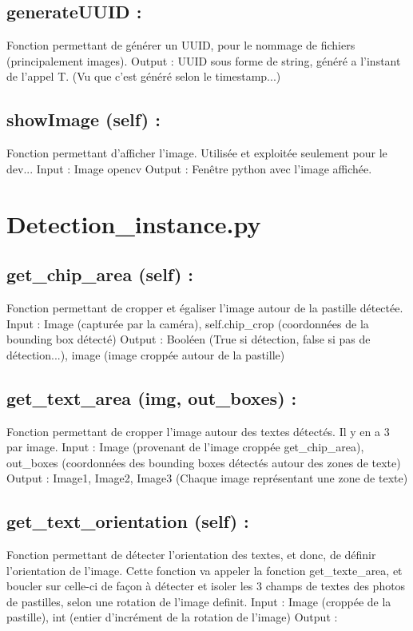 \subsection{generateUUID :}
Fonction permettant de générer un UUID, pour le nommage de fichiers (principalement images).
Output : UUID sous forme de string, généré a l’instant de l’appel T. (Vu que c’est généré selon le timestamp...)

\subsection{showImage (self) :}
Fonction permettant d’afficher l’image. Utilisée et exploitée seulement pour le dev...
Input : Image opencv
Output : Fenêtre python avec l’image affichée.

\section{Detection_instance.py}
\subsection{get_chip_area (self) :}
Fonction permettant de cropper et égaliser l’image autour de la pastille détectée.
Input : Image (capturée par la caméra), self.chip_crop (coordonnées de la bounding box détecté)
Output : Booléen (True si détection, false si pas de détection...), image (image croppée autour de la pastille)

\subsection{get_text_area (img, out_boxes) :}
Fonction permettant de cropper l’image autour des textes détectés. Il y en a 3 par image.
Input : Image (provenant de l’image croppée get_chip_area), out_boxes (coordonnées des bounding boxes détectés autour des zones de texte)
Output : Image1, Image2, Image3 (Chaque image représentant une zone de texte)

\subsection{get_text_orientation (self) :}
Fonction permettant de détecter l’orientation des textes, et donc, de définir l’orientation de l’image.
Cette fonction va appeler la fonction get_texte_area, et boucler sur celle-ci de façon à détecter et isoler les 3 champs de textes des photos de pastilles, selon une rotation de l’image definit.
Input : Image (croppée de la pastille), int (entier d’incrément de la rotation de l’image)
Output :

